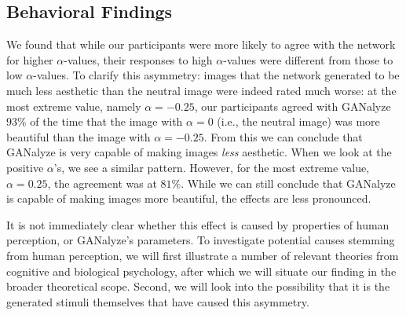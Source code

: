 \documentclass[../main.tex]{subfiles}
\begin{document}




\subsection{Behavioral Findings}
We found that while our participants were more likely to agree with the network for higher $\alpha$-values, their responses to high $\alpha$-values were different from those to low $\alpha$-values. To clarify this asymmetry: images that the network generated to be much less aesthetic than the neutral image were indeed rated much worse: at the most extreme value, namely $\alpha = -0.25$, our participants agreed with GANalyze $93\%$ of the time that the image with $\alpha = 0$ (i.e., the neutral image) was more beautiful than the image with $\alpha = -0.25$. From this we can conclude that GANalyze is very capable of making images \textit{less} aesthetic. When we look at the positive $\alpha$'s, we see a similar pattern. However, for the most extreme value, $\alpha = 0.25$, the agreement was at $81\%$. While we can still conclude that GANalyze is capable of making images more beautiful, the effects are less pronounced. 

It is not immediately clear whether this effect is caused by properties of human perception, or GANalyze's parameters. To investigate potential causes stemming from human perception, we will first illustrate a number of relevant theories from cognitive and biological psychology, after which we will situate our finding in the broader theoretical scope. Second, we will look into the possibility that it is the generated stimuli themselves that have caused this asymmetry.
\end{document}
